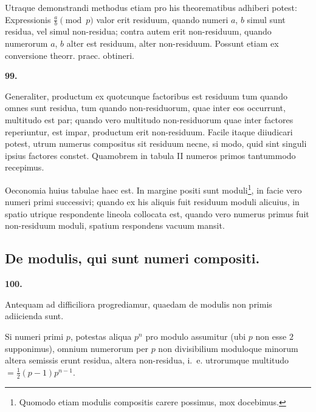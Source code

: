 \documentclass[12pt,a4paper]{article}
\theoremstyle{plain}
\theoremstyle{definition}
\theoremstyle{remark}
\begin{document}
Utraque demonstrandi methodus etiam pro his theorematibus adhiberi potest: Expressionis $\frac{a}{b} \pmod{p}$ valor erit residuum, quando numeri $a$, $b$ simul sunt residua, vel simul non-residua; contra autem erit non-residuum, quando numerorum $a$, $b$ alter est residuum, alter non-residuum. Possunt etiam ex conversione theorr. praec. obtineri.

\setcounter{satz}{99}
\addtocounter{satz}{-1}
\textbf{99.}

Generaliter, productum ex quotcunque factoribus est residuum tum quando omnes sunt residua, tum quando non-residuorum, quae inter eos occurrunt, multitudo est par; quando vero multitudo non-residuorum quae inter factores reperiuntur, est impar, productum erit non-residuum. Facile itaque diiudicari potest, utrum numerus compositus sit residuum necne, si modo, quid sint singuli ipsius factores constet. Quamobrem in tabula II numeros primos tantummodo recepimus.

Oeconomia huius tabulae haec est. In margine positi sunt moduli\footnote{Quomodo etiam modulis compositis carere possimus, mox docebimus.}, in facie vero numeri primi successivi; quando ex his aliquis fuit residuum moduli alicuius, in spatio utrique respondente lineola collocata est, quando vero numerus primus fuit non-residuum moduli, spatium respondens vacuum mansit.

\subsection*{De modulis, qui sunt numeri compositi.}

\setcounter{satz}{100}
\addtocounter{satz}{-1}
\textbf{100.}

Antequam ad difficiliora progrediamur, quaedam de modulis non primis adiicienda sunt.

Si numeri primi $p$, potestas aliqua $p^n$ pro modulo assumitur (ubi $p$ non esse $2$ supponimus), omnium numerorum per $p$ non divisibilium moduloque minorum altera semissis erunt residua, altera non-residua, i.~e. utrorumque multitudo $=\frac{1}{2}(p-1)p^{n-1}$.
\end{document}
